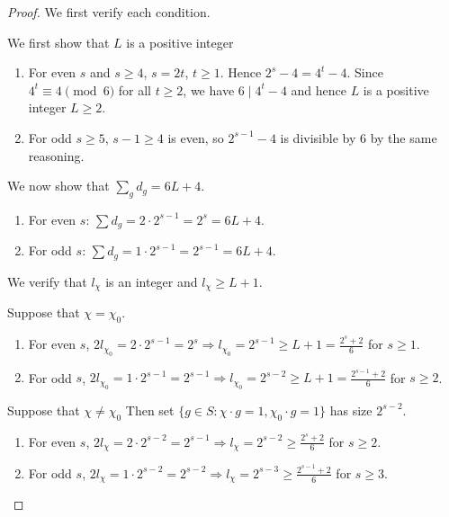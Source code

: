 \documentclass[12pt,twoside,]{amsart}
\theoremstyle{plain}
\theoremstyle{definition}
\begin{document}
\begin{proof}
We first verify each condition.

\noindent We first show that $L$ is a positive integer 
\begin{enumerate}
    \item For even $s$ and $s \geq 4$, $s = 2t$, $t \geq 1$. Hence $2^s - 4 = 4^t - 4$. Since $4^t \equiv 4 \pmod{6}$ for all $t \ge 2$, we have $6 \mid 4^t - 4$ and hence $L$ is a positive integer $L \geq 2$.
    \item For odd $s \ge 5$, $s-1 \ge 4$ is even, so $2^{s-1} - 4$ is divisible by 6 by the same reasoning.
\end{enumerate}

\noindent We now show that $\sum_g d_g = 6L+4$.
\begin{enumerate}
    \item For even $s$: $\sum d_g = 2 \cdot 2^{s-1} = 2^s = 6L+4$. 
    \item For odd $s$: $\sum d_g = 1 \cdot 2^{s-1} = 2^{s-1} = 6L+4$.
\end{enumerate}

\noindent We verify that $l_{\chi}$ is an integer and $l_{\chi} \geq L+1$.

Suppose that $\chi = \chi_0$.
\begin{enumerate}
    \item For even $s$, $2l_{\chi_0} = 2 \cdot 2^{s-1} = 2^s \Rightarrow l_{\chi_0} = 2^{s-1} \ge L+1 = \frac{2^s + 2}{6}$ for $s \geq 1$. 
    \item For odd $s$, $2l_{\chi_0} = 1 \cdot 2^{s-1} = 2^{s-1} \Rightarrow l_{\chi_0} = 2^{s-2} \ge L+1 = \frac{2^{s-1} + 2}{6}$ for $s \geq 2$. 
\end{enumerate}

Suppose that $\chi \neq \chi_0$ Then set $\{ g \in S : \chi \cdot g = 1, \chi_0 \cdot g = 1 \}$ has size $2^{s-2}$.
\begin{enumerate}
    \item For even $s$, $2l_\chi = 2 \cdot 2^{s-2} = 2^{s-1} \Rightarrow l_\chi = 2^{s-2} \ge \frac{2^s + 2}{6}$ for $s \geq 2$. 
    \item For odd $s$, $2l_\chi = 1 \cdot 2^{s-2} = 2^{s-2} \Rightarrow l_\chi = 2^{s-3} \ge \frac{2^{s-1} + 2}{6}$ for $s \geq 3$. 
\end{enumerate}

\end{proof}
\end{document}
